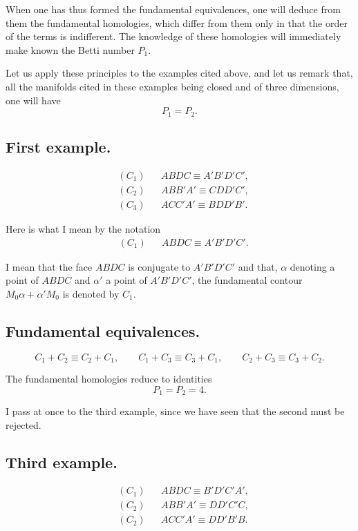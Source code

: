 \documentclass{article}
\begin{document}
When one has thus formed the fundamental equivalences, one will deduce from them the fundamental homologies, which differ from them only in that the order of the terms is indifferent. The knowledge of these homologies will immediately make known the Betti number $P_{1}$.

Let us apply these principles to the examples cited above, and let us remark that, all the manifolds cited in these examples being closed and of three dimensions, one will have
\[ P_{1} = P_{2}. \]

\subsection*{First example.}

\[ \begin{aligned} &(C_{1}) &&ABDC \equiv A'B'D'C',\\ &(C_{2}) &&ABB'A' \equiv CDD'C',\\ &(C_{3}) &&ACC'A' \equiv BDD'B'. \end{aligned} \]

Here is what I mean by the notation
\[ \begin{aligned} &(C_{1}) &&ABDC \equiv A'B'D'C'. \end{aligned} \]

I mean that the face $ABDC$ is conjugate to $A'B'D'C'$ and that, $\alpha$ denoting a point of $ABDC$ and $\alpha'$ a point of $A'B'D'C'$, the fundamental contour $M_{0}\alpha + \alpha'M_{0}$ is denoted by $C_{1}$.

\subsection*{Fundamental equivalences.}

\[ C_{1} + C_{2} \equiv C_{2} + C_{1}, \qquad C_{1} + C_{3} \equiv C_{3} + C_{1}, \qquad C_{2} + C_{3} \equiv C_{3} + C_{2}. \]

The fundamental homologies reduce to identities
\[ P_{1} = P_{2} = 4. \]

I pass at once to the third example, since we have seen that the second must be rejected.

\subsection*{Third example.}

\[ \begin{aligned} &(C_{1}) &&ABDC \equiv B'D'C'A',\\ &(C_{2}) &&ABB'A' \equiv DD'C'C,\\ &(C_{2}) &&ACC'A' \equiv DD'B'B. \end{aligned} \]
\end{document}
